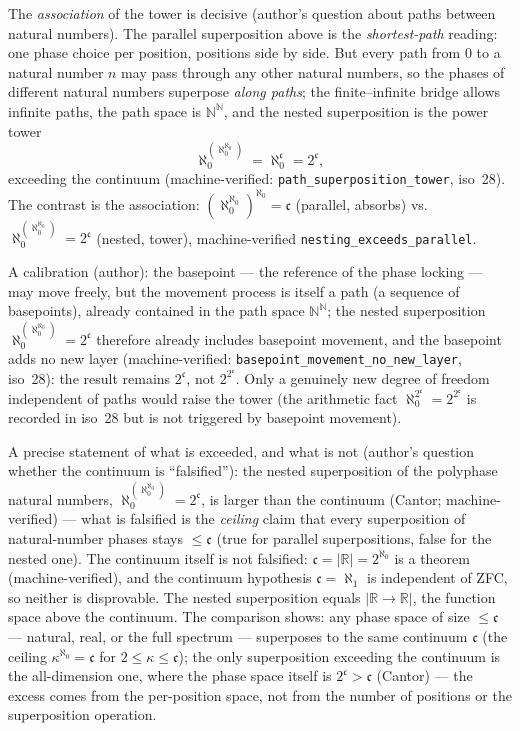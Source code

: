\documentclass{article}
\begin{document}
The \emph{association} of the tower is decisive (author's question about
paths between natural numbers). The parallel superposition above is the
\emph{shortest-path} reading: one phase choice per position, positions
side by side. But every path from $0$ to a natural number $n$ may pass
through any other natural numbers, so the phases of different natural
numbers superpose \emph{along paths}; the finite--infinite bridge allows
infinite paths, the path space is $\mathbb N^{\mathbb N}$, and the
nested superposition is the power tower
\[
\aleph_0^{(\aleph_0^{\aleph_0})}
=\aleph_0^{\mathfrak c}
=2^{\mathfrak c},
\]
exceeding the continuum (machine-verified:
\texttt{path\_superposition\_tower}, iso~28). The contrast is the
association:
$(\aleph_0^{\aleph_0})^{\aleph_0}=\mathfrak c$ (parallel, absorbs) vs.
$\aleph_0^{(\aleph_0^{\aleph_0})}=2^{\mathfrak c}$ (nested, tower),
machine-verified \texttt{nesting\_exceeds\_parallel}.

A calibration (author): the basepoint --- the reference of the phase
locking --- may move freely, but the movement process is itself a path
(a sequence of basepoints), already contained in the path space
$\mathbb N^{\mathbb N}$; the nested superposition
$\aleph_0^{(\aleph_0^{\aleph_0})}=2^{\mathfrak c}$ therefore already
includes basepoint movement, and the basepoint adds no new layer
(machine-verified: \texttt{basepoint\_movement\_no\_new\_layer}, iso~28):
the result remains $2^{\mathfrak c}$, not $2^{2^{\mathfrak c}}$. Only a
genuinely new degree of freedom independent of paths would raise the
tower (the arithmetic fact
$\aleph_0^{2^{\mathfrak c}}=2^{2^{\mathfrak c}}$ is recorded in iso~28
but is not triggered by basepoint movement).

A precise statement of what is exceeded, and what is not (author's
question whether the continuum is ``falsified''): the nested
superposition of the polyphase natural numbers,
$\aleph_0^{(\aleph_0^{\aleph_0})}=2^{\mathfrak c}$, is larger than the
continuum (Cantor; machine-verified) --- what is falsified is the
\emph{ceiling} claim that every superposition of natural-number phases
stays $\le\mathfrak c$ (true for parallel superpositions, false for the
nested one). The continuum itself is not falsified: $\mathfrak c=|\mathbb
R|=2^{\aleph_0}$ is a theorem (machine-verified), and the continuum
hypothesis $\mathfrak c=\aleph_1$ is independent of ZFC, so neither is
disprovable. The nested superposition equals $|\mathbb R\to\mathbb R|$,
the function space above the continuum. The comparison
shows: any
phase space of size $\le\mathfrak c$ --- natural, real, or the full
spectrum --- superposes to the same continuum $\mathfrak c$ (the ceiling
$\kappa^{\aleph_0}=\mathfrak c$ for $2\le\kappa\le\mathfrak c$); the
only superposition exceeding the continuum is the all-dimension one,
where the phase space itself is $2^{\mathfrak c}>\mathfrak c$ (Cantor)
--- the excess comes from the per-position space, not from the number of
positions or the superposition operation.
\end{document}
